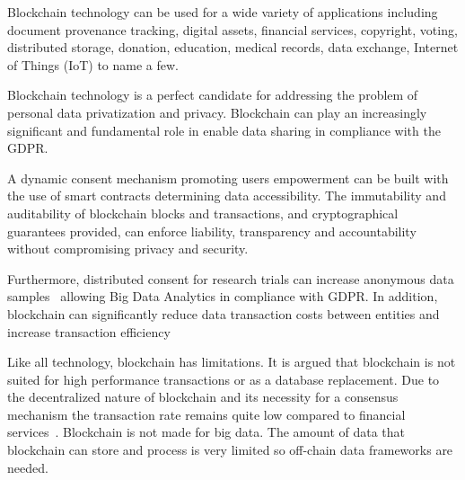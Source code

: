 Blockchain technology can be used for a wide variety of applications including document provenance tracking, digital assets, financial services, copyright, voting, distributed storage, donation, education, medical records, data exchange, Internet of Things (IoT) to name a few.

Blockchain technology is a perfect candidate for addressing the problem of personal data privatization and privacy. Blockchain can play an increasingly significant and fundamental role in enable data sharing in compliance with the GDPR.

A dynamic consent mechanism promoting users empowerment can be built with the use of smart contracts determining data accessibility. The immutability and auditability of blockchain blocks and transactions, and cryptographical guarantees provided, can enforce liability, transparency and accountability without compromising privacy and security.

Furthermore, distributed consent for research trials can increase anonymous data samples~\cite{ibm} allowing Big Data Analytics in compliance with GDPR. In addition, blockchain can significantly reduce data transaction costs between entities and increase transaction efficiency

Like all technology, blockchain has limitations. It is argued that blockchain is not suited for high performance transactions or as a database replacement. Due to the decentralized nature of blockchain and its necessity for a consensus mechanism the transaction rate remains quite low compared to financial services~\cite{Sompolinsky2015, Zohar:2015:BUH:2817191.2701411}. Blockchain is not made for big data. The amount of data that blockchain can store and process is very limited so off-chain data frameworks are needed.

